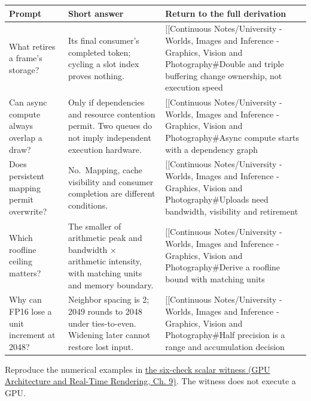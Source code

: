 {\def\LTcaptype{none} %
\begin{longtable}[]{@{}
  >{\raggedright\arraybackslash}p{}
  >{\raggedright\arraybackslash}p{}
  >{\raggedright\arraybackslash}p{}@{}}
\toprule\noalign{}
\begin{minipage}[b]{\linewidth}\raggedright
Prompt
\end{minipage} & \begin{minipage}[b]{\linewidth}\raggedright
Short answer
\end{minipage} & \begin{minipage}[b]{\linewidth}\raggedright
Return to the full derivation
\end{minipage} \\
\midrule\noalign{}
\endhead
\bottomrule\noalign{}
\endlastfoot
What retires a frame's storage? & Its final consumer's completed token; cycling a slot index proves nothing. & {[}{[}Continuous Notes/University - Worlds, Images and Inference - Graphics, Vision and Photography\#Double and triple buffering change ownership, not execution speed \\
Can async compute always overlap a draw? & Only if dependencies and resource contention permit. Two queues do not imply independent execution hardware. & {[}{[}Continuous Notes/University - Worlds, Images and Inference - Graphics, Vision and Photography\#Async compute starts with a dependency graph \\
Does persistent mapping permit overwrite? & No.~Mapping, cache visibility and consumer completion are different conditions. & {[}{[}Continuous Notes/University - Worlds, Images and Inference - Graphics, Vision and Photography\#Uploads need bandwidth, visibility and retirement \\
Which roofline ceiling matters? & The smaller of arithmetic peak and bandwidth × arithmetic intensity, with matching units and memory boundary. & {[}{[}Continuous Notes/University - Worlds, Images and Inference - Graphics, Vision and Photography\#Derive a roofline bound with matching units \\
Why can FP16 lose a unit increment at 2048? & Neighbor spacing is 2; 2049 rounds to 2048 under ties-to-even. Widening later cannot restore lost input. & {[}{[}Continuous Notes/University - Worlds, Images and Inference - Graphics, Vision and Photography\#Half precision is a range and accumulation decision \\
\end{longtable}
}

Reproduce the numerical examples in \href{../06-GPU-Architecture-and-Real-Time-Rendering/main.pdf\#nameddest=03-visual-computing-i-ch016-check-the-scheduling-and-precision-examples-with-a-scalar-witness}{the six-check scalar witness (GPU Architecture and Real-Time Rendering, Ch. 9)}. The witness does not execute a GPU.
